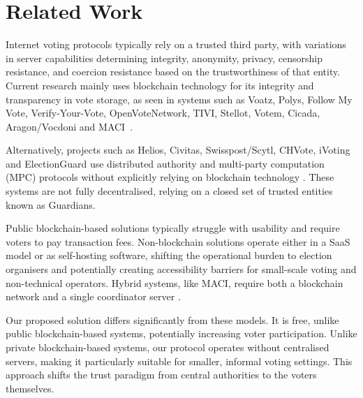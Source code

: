 \documentclass[runningheads]{llncs}
\begin{document}
\section{Related Work}
Internet voting protocols typically rely on a trusted third party, with variations in server capabilities determining integrity, anonymity, privacy, censorship resistance, and coercion resistance based on the trustworthiness of that entity. Current research mainly uses blockchain technology for its integrity and transparency in vote storage, as seen in systems such as Voatz, Polys, Follow My Vote, Verify-Your-Vote, OpenVoteNetwork, TIVI, Stellot, Votem, Cicada, Aragon/Vocdoni and MACI~\cite{mooreWestVirginiaMobile2019, PolysOnlineVoting, SecureDecentralizedApplication2023, chaiebVerifyYourVoteVerifiableBlockchainBased2019, haoAnonymousVotingTworound2010, mccorrySmartContractBoardroom2017, seifelnasrScalableOpenVoteNetwork2020, elsheikhDisputefreeScalableOpen2022, TIVIPoweredSmartmatic, NowYouCan2016, baranskiPracticalIVotingStellar2020, votemcorpVotemProofofvoteVotem, BuildingCicadaPrivate, A16zCicada2023, ethereumfoundationMinimalAntiCollusionInfrastructure2022, VocdoniIntroductionVocdoni, PrivacyscalingexplorationsMaci2023}.

Alternatively, projects such as Helios, Civitas, Swisspost/Scytl, CHVote, iVoting and ElectionGuard use distributed authority and multi-party computation (MPC) protocols without explicitly relying on blockchain technology \cite{adidaHeliosWebbasedOpenAudit2008, clarksonCivitasSecureVoting2008, 
CHVoteProjectRelease,roenneJCJImprovedVerifiability2016, benalohElectionGuardDesignSpecification2023}. These systems are not fully decentralised, relying on a closed set of trusted entities known as Guardians.

Public blockchain-based solutions typically struggle with usability and require voters to pay transaction fees. Non-blockchain solutions operate either in a SaaS model or as self-hosting software, shifting the operational burden to election organisers and potentially creating accessibility barriers for small-scale voting and non-technical operators. Hybrid systems, like MACI, require both a blockchain network and a single coordinator server \cite{ethereumfoundationMinimalAntiCollusionInfrastructure2022, PrivacyscalingexplorationsMaci2023}.

Our proposed solution differs significantly from these models. It is free, unlike public blockchain-based systems, potentially increasing voter participation. Unlike private blockchain-based systems, our protocol operates without centralised servers, making it particularly suitable for smaller, informal voting settings. This approach shifts the trust paradigm from central authorities to the voters themselves.
\end{document}
